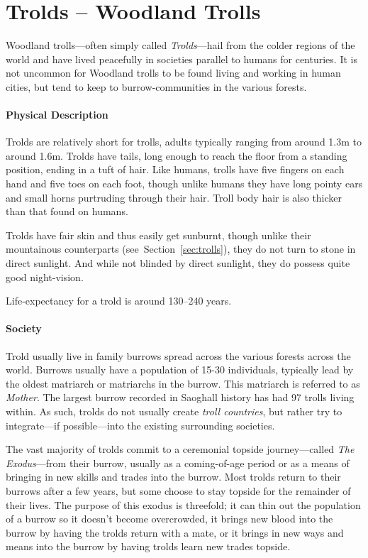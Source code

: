 \section{Trolds -- Woodland Trolls}
Woodland trolls---often simply called \textit{Trolds}---hail from the colder regions of the world and have lived peacefully in societies parallel to humans for centuries.
It is not uncommon for Woodland trolls to be found living and working in human cities, but tend to keep to burrow-communities in the various forests.

\paragraph{Physical Description}
Trolds are relatively short for trolls, adults typically ranging from around 1.3m to around 1.6m.
Trolds have tails, long enough to reach the floor from a standing position, ending in a tuft of hair.
Like humans, trolls have five fingers on each hand and five toes on each foot, though unlike humans they have long pointy ears and small horns purtruding through their hair.
Troll body hair is also thicker than that found on humans.

Trolds have fair skin and thus easily get sunburnt, though unlike their mountainous counterparts (see~Section~\ref{sec:trolls}), they do not turn to stone in direct sunlight.
And while not blinded by direct sunlight, they do possess quite good night-vision.

Life-expectancy for a trold is around 130--240 years.

\paragraph{Society}
Trold usually live in family burrows spread across the various forests across the world.
Burrows usually have a population of 15-30 individuals, typically lead by the oldest matriarch or matriarchs in the burrow. 
This matriarch is referred to as \textit{Mother}.
The largest burrow recorded in Saoghall history has had 97 trolls living within.
As such, trolds do not usually create \textit{troll countries}, but rather try to integrate---if possible---into the existing surrounding societies.

The vast majority of trolds commit to a ceremonial topside journey---called \textit{The Exodus}---from their burrow, usually as a coming-of-age period or as a means of bringing in new skills and trades into the burrow.
Most trolds return to their burrows after a few years, but some choose to stay topside for the remainder of their lives.
The purpose of this exodus is threefold; it can thin out the population of a burrow so it doesn't become overcrowded, it brings new blood into the burrow by having the trolds return with a mate, or it brings in new ways and means into the burrow by having trolds learn new trades topside.

